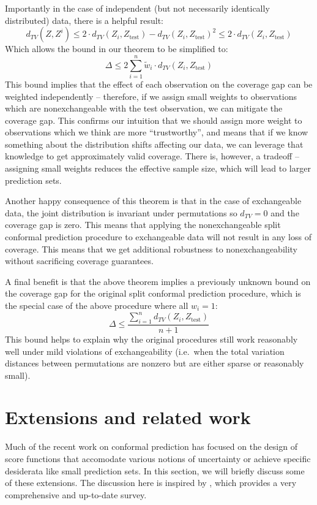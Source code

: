 \documentclass[a4paper, 12pt]{article}
\begin{document}
Importantly in the case of independent (but not necessarily identically distributed) data, there is a helpful result:
\[ d_{TV}(Z, Z^i) \leq 2 \cdot d_{TV}(Z_i, Z_{\text{test}}) - d_{TV}(Z_i, Z_{\text{test}})^2 \leq 2 \cdot d_{TV}(Z_i, Z_{\text{test}}) \]
Which allows the bound in our theorem to be simplified to:
\[\Delta \leq 2 \sum_{i=1}^n \tilde{w}_i \cdot d_{TV}(Z_i, Z_{\text{test}})\]
This bound implies that the effect of each observation on the coverage gap can be weighted independently -- therefore, if we assign small weights to observations which are nonexchangeable with the test observation, we can mitigate the coverage gap. This confirms our intuition that we should assign more weight to observations which we think are more ``trustworthy'', and means that if we know something about the distribution shifts affecting our data, we can leverage that knowledge to get approximately valid coverage. There is, however, a tradeoff -- assigning small weights reduces the effective sample size, which will lead to larger prediction sets.

Another happy consequence of this theorem is that in the case of exchangeable data, the joint distribution is invariant under permutations so $d_{TV}=0$ and the coverage gap is zero. This means that applying the nonexchangeable split conformal prediction procedure to exchangeable data will not result in any loss of coverage. This means that we get additional robustness to nonexchangeability without sacrificing coverage guarantees.

A final benefit is that the above theorem implies a previously unknown bound on the coverage gap for the original split conformal prediction procedure, which is the special case of the above procedure where all $w_i=1$:
\[\Delta \leq  \frac{\sum_{i=1}^n d_{TV}(Z_i, Z_{\text{test}})}{n+1}\]
This bound helps to explain why the original procedures still work reasonably well under mild violations of exchangeability (i.e.\ when the total variation distances between permutations are nonzero but are either sparse or reasonably small).


\section{Extensions and related work}
\label{sec:extensions}
Much of the recent work on conformal prediction has focused on the design of score functions that accomodate various notions of uncertainty or achieve specific desiderata like small prediction sets. In this section, we will briefly discuss some of these extensions. The discussion here is inspired by \textcite{angelopoulosGentleIntroductionConformal2022}, which provides a very comprehensive and up-to-date survey.
\end{document}
